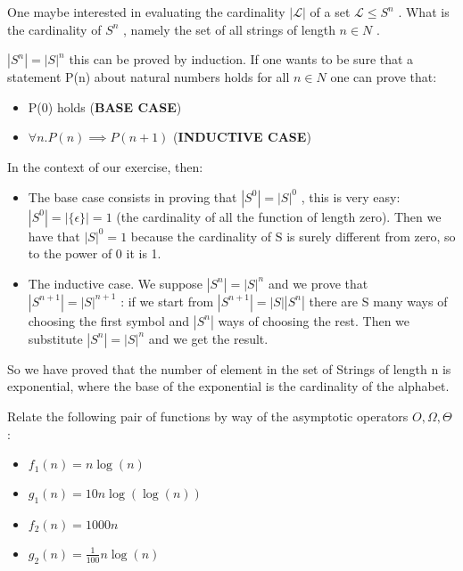 \begin{ex}
	One maybe interested in evaluating the cardinality \(|\mathcal{L}|\) of a set \(\mathcal{L} \leq S^n\) . What is the cardinality of \(S^n\) , namely the set of all strings of length \(n \in N\) .\\
\end{ex}
\begin{solution}
	\(|S^n| = |S|^n\)
	this can be proved by induction. If one wants to be sure that a statement P(n) about natural numbers holds for all \(n \in N\) one can prove that:
	\begin{itemize}
		\item P(0) holds (\textbf{BASE CASE})
		\item \(\forall n. P(n) \implies P (n+1)\) (\textbf{INDUCTIVE CASE})
	\end{itemize}
	In the context of our exercise, then:
	\begin{itemize}
		\item The base case consists in proving that \(|S^0| = |S|^0\) , this is very easy: \(|S^0| = |\{\epsilon\}| = 1 \) (the cardinality of all the function of length zero). Then we have that  \(|S|^0= 1\) because the cardinality of S is surely different from zero, so to the power of 0 it is 1.
		\item The inductive case. We suppose \(|S^n| = |S|^n\) and we prove that \(|S^{n+1}| = |S|^{n+1}\)  : if we start from \(|S^{n+1}|= |S| |S^n|\) there are S many ways of choosing the first symbol and \(|S^n|\) ways of choosing the rest. Then we substitute  \(|S^n| = |S|^n\) and we get the result.
	\end{itemize}
	So we have proved that the number of element in the set of Strings of length n is exponential, where the base of the exponential is the cardinality of the alphabet.
\end{solution}
\begin{ex}
	Relate the following pair of functions by way of the asymptotic operators \(O, \Omega,\Theta\) :
	\begin{itemize}
		\item \(f_1 (n) = n \log(n)\)
		\item \(g_1(n) = 10 n \log (\log (n))\)
		\item \(f_2 (n) = 1000n\)
		\item \(g_2(n) = \frac{1}{100}n \log(n)\)
	\end{itemize}
\end{ex}
